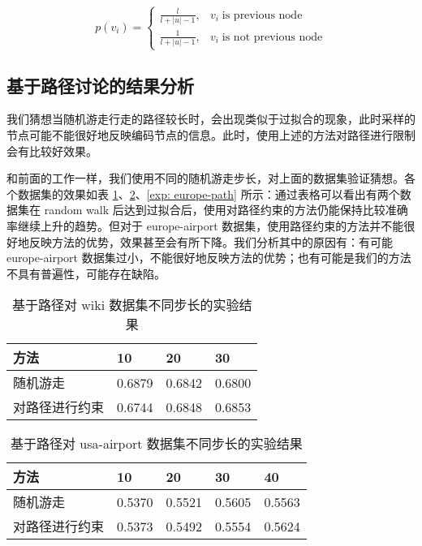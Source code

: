\documentclass{ctexart}
\begin{document}
\begin{equation}
    p(v_i) = \begin{cases}
        \frac{l}{l + |u| - 1},& v_i \;\text{is previous node} \\
        \frac{1}{l + |u| - 1},& v_i \;\text{is not previous node}
    \end{cases}
\end{equation}

\subsection{基于路径讨论的结果分析}

我们猜想当随机游走行走的路径较长时，会出现类似于过拟合的现象，此时采样的节点可能不能很好地反映编码节点的信息。此时，使用上述的方法对路径进行限制会有比较好效果。

和前面的工作一样，我们使用不同的随机游走步长，对上面的数据集验证猜想。各个数据集的效果如表 \ref{exp: wiki-path}、\ref{exp: usa-path}、\ref{exp: europe-path} 所示：通过表格可以看出有两个数据集在 random walk 后达到过拟合后，使用对路径约束的方法仍能保持比较准确率继续上升的趋势。但对于 europe-airport 数据集，使用路径约束的方法并不能很好地反映方法的优势，效果甚至会有所下降。我们分析其中的原因有：有可能 europe-airport 数据集过小，不能很好地反映方法的优势；也有可能是我们的方法不具有普遍性，可能存在缺陷。

\begin{table}[!t]
\renewcommand{\arraystretch}{1.1}
\caption{基于路径对 wiki 数据集不同步长的实验结果}
\label{exp: wiki-path}
\centering
\begin{tabular}{|l|l|l|l|}
    \hline
    方法 & 10 & 20 & 30 \\
    \hline
    随机游走 & 0.6879 & 0.6842 & 0.6800 \\
    \hline
    对路径进行约束 & 0.6744 & 0.6848 & 0.6853 \\
    \hline
\end{tabular}
\end{table}

\begin{table}[!t]
\renewcommand{\arraystretch}{1.1}
\caption{基于路径对 usa-airport 数据集不同步长的实验结果}
\label{exp: usa-path}
\centering
\begin{tabular}{|l|l|l|l|l|}
    \hline
    方法 & 10 & 20 & 30 & 40 \\
    \hline
    随机游走 & 0.5370 & 0.5521 & 0.5605 & 0.5563 \\
    \hline
    对路径进行约束 & 0.5373 & 0.5492 & 0.5554 & 0.5624 \\
    \hline
\end{tabular}
\end{table}
\end{document}
